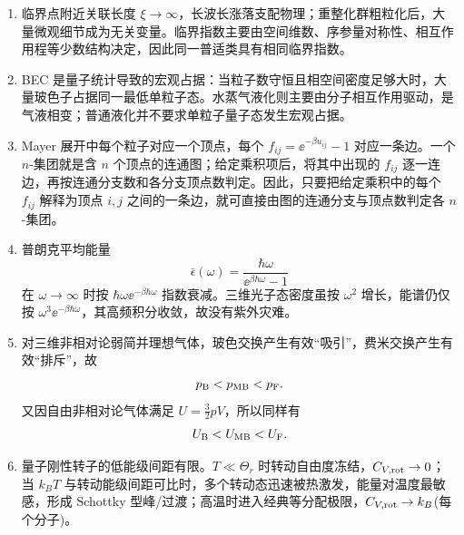 \begin{question}[40 分]
\begin{solution}
\begin{enumerate}
  \item 临界点附近关联长度 $\xi\to\infty$，长波长涨落支配物理；重整化群粗粒化后，大量微观细节成为无关变量。临界指数主要由空间维数、序参量对称性、相互作用程等少数结构决定，因此同一普适类具有相同临界指数。
  \item BEC 是量子统计导致的宏观占据：当粒子数守恒且相空间密度足够大时，大量玻色子占据同一最低单粒子态。水蒸气液化则主要由分子相互作用驱动，是气液相变；普通液化并不要求单粒子量子态发生宏观占据。
  \item Mayer 展开中每个粒子对应一个顶点，每个 $f_{ij}=\ee^{-\beta u_{ij}}-1$ 对应一条边。一个 $n$-集团就是含 $n$ 个顶点的连通图；给定乘积项后，将其中出现的 $f_{ij}$ 逐一连边，再按连通分支数和各分支顶点数判定。因此，只要把给定乘积中的每个 $f_{ij}$ 解释为顶点 $i,j$ 之间的一条边，就可直接由图的连通分支与顶点数判定各 $n$-集团。
  \item 普朗克平均能量
  \[\bar\epsilon(\omega)=\frac{\hbar\omega}{\ee^{\beta\hbar\omega}-1}\]
  在 $\omega\to\infty$ 时按 $\hbar\omega\ee^{-\beta\hbar\omega}$ 指数衰减。三维光子态密度虽按 $\omega^2$ 增长，能谱仍仅按 $\omega^3\ee^{-\beta\hbar\omega}$，其高频积分收敛，故没有紫外灾难。
  \item 对三维非相对论弱简并理想气体，玻色交换产生有效“吸引”，费米交换产生有效“排斥”，故
  \[p_{\rm B}<p_{\rm MB}<p_{\rm F}.\]
  又因自由非相对论气体满足 $U=\tfrac32pV$，所以同样有
  \[U_{\rm B}<U_{\rm MB}<U_{\rm F}.\]
  \item 量子刚性转子的低能级间距有限。$T\ll\Theta_r$ 时转动自由度冻结，$C_{V,\rm rot}\to0$；当 $k_BT$ 与转动能级间距可比时，多个转动态迅速被热激发，能量对温度最敏感，形成 Schottky 型峰/过渡；高温时进入经典等分配极限，$C_{V,\rm rot}\to k_B$(每个分子)。
\end{enumerate}
\end{solution}
\end{question}

